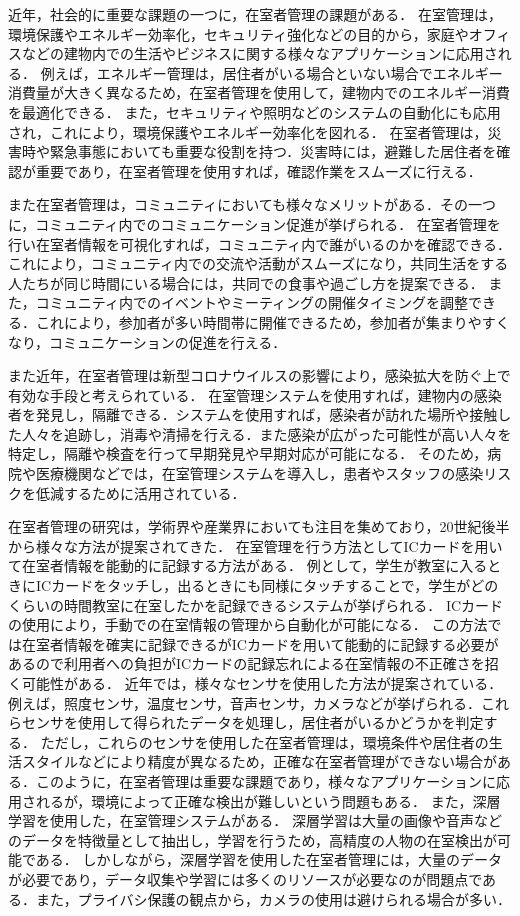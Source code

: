 近年，社会的に重要な課題の一つに，在室者管理の課題がある．
在室管理は，環境保護やエネルギー効率化，セキュリティ強化などの目的から，家庭やオフィスなどの建物内での生活やビジネスに関する様々なアプリケーションに応用される．
例えば，エネルギー管理は，居住者がいる場合といない場合でエネルギー消費量が大きく異なるため，在室者管理を使用して，建物内でのエネルギー消費を最適化できる．
また，セキュリティや照明などのシステムの自動化にも応用され，これにより，環境保護やエネルギー効率化を図れる．
在室者管理は，災害時や緊急事態においても重要な役割を持つ．災害時には，避難した居住者を確認が重要であり，在室者管理を使用すれば，確認作業をスムーズに行える．

また在室者管理は，コミュニティにおいても様々なメリットがある．その一つに，コミュニティ内でのコミュニケーション促進が挙げられる．
在室者管理を行い在室者情報を可視化すれば，コミュニティ内で誰がいるのかを確認できる．これにより，コミュニティ内での交流や活動がスムーズになり，共同生活をする人たちが同じ時間にいる場合には，共同での食事や過ごし方を提案できる．
また，コミュニティ内でのイベントやミーティングの開催タイミングを調整できる．これにより，参加者が多い時間帯に開催できるため，参加者が集まりやすくなり，コミュニケーションの促進を行える．


また近年，在室者管理は新型コロナウイルスの影響により，感染拡大を防ぐ上で有効な手段と考えられている．
在室管理システムを使用すれば，建物内の感染者を発見し，隔離できる．システムを使用すれば，感染者が訪れた場所や接触した人々を追跡し，消毒や清掃を行える．また感染が広がった可能性が高い人々を特定し，隔離や検査を行って早期発見や早期対応が可能になる．
そのため，病院や医療機関などでは，在室管理システムを導入し，患者やスタッフの感染リスクを低減するために活用されている．

在室者管理の研究は，学術界や産業界においても注目を集めており，20世紀後半から様々な方法が提案されてきた．
在室管理を行う方法としてICカードを用いて在室者情報を能動的に記録する方法がある．
例として，学生が教室に入るときにICカードをタッチし，出るときにも同様にタッチすることで，学生がどのくらいの時間教室に在室したかを記録できるシステムが挙げられる． ICカードの使用により，手動での在室情報の管理から自動化が可能になる．
この方法では在室者情報を確実に記録できるがICカードを用いて能動的に記録する必要があるので利用者への負担がICカードの記録忘れによる在室情報の不正確さを招く可能性がある．
近年では，様々なセンサを使用した方法が提案されている．例えば，照度センサ，温度センサ，音声センサ，カメラなどが挙げられる．これらセンサを使用して得られたデータを処理し，居住者がいるかどうかを判定する．
ただし，これらのセンサを使用した在室者管理は，環境条件や居住者の生活スタイルなどにより精度が異なるため，正確な在室者管理ができない場合がある．このように，在室者管理は重要な課題であり，様々なアプリケーションに応用されるが，環境によって正確な検出が難しいという問題もある．
また，深層学習を使用した，在室管理システムがある．
深層学習は大量の画像や音声などのデータを特徴量として抽出し，学習を行うため，高精度の人物の在室検出が可能である．
しかしながら，深層学習を使用した在室者管理には，大量のデータが必要であり，データ収集や学習には多くのリソースが必要なのが問題点である．また，プライバシ保護の観点から，カメラの使用は避けられる場合が多い．


